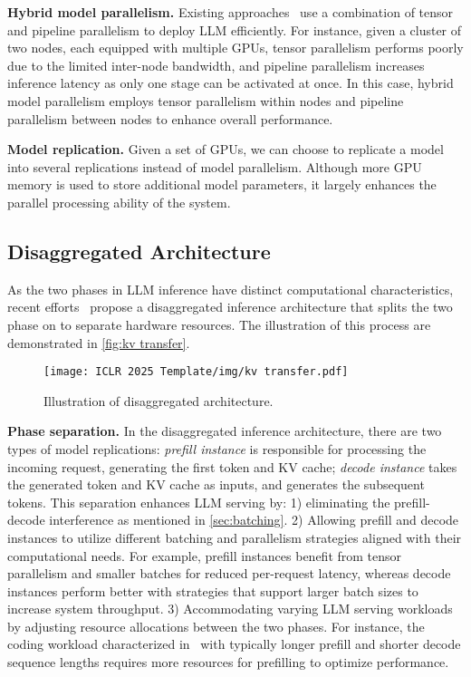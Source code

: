\textbf{Hybrid model parallelism.} Existing approaches~\cite{jianghexgen,zhong2024distserve,miao2024spotserve,li2023alpaserve} use a combination of tensor and pipeline parallelism to deploy LLM efficiently. For instance, given a cluster of two nodes, each equipped with multiple GPUs, tensor parallelism performs poorly due to the limited inter-node bandwidth, and pipeline parallelism increases inference latency as only one stage can be activated at once. In this case, hybrid model parallelism employs tensor parallelism within nodes and pipeline parallelism between nodes to enhance overall performance.

\textbf{Model replication.} Given a set of GPUs, we can choose to replicate a model into several replications instead of model parallelism. Although more GPU memory is used to store additional model parameters, it largely enhances the parallel processing ability of the system.

\subsection{Disaggregated Architecture}

As the two phases in LLM inference have distinct computational characteristics, recent efforts~\cite{zhong2024distserve,patel2024splitwise,jin2024p,qin2024mooncake,hu2024inference} propose a disaggregated inference architecture that splits the two phase on to separate hardware resources. The illustration of this process are demonstrated in \autoref{fig:kv transfer}.

\begin{wrapfigure}{r}{0.5\linewidth}
    \centering
    \texttt{[image: ICLR 2025 Template/img/kv transfer.pdf]}
    \caption{Illustration of disaggregated architecture.}
    \label{fig:kv transfer}
\end{wrapfigure} 


\textbf{Phase separation.} In the disaggregated inference architecture, there are two types of model replications: \textit{prefill instance} is responsible for processing the incoming request, generating the first token and KV cache; \textit{decode instance} takes the generated token and KV cache as inputs, and generates the subsequent tokens. This separation enhances LLM serving by: 1) eliminating the prefill-decode interference as mentioned in \autoref{sec:batching}. 2) Allowing prefill and decode instances to utilize different batching and parallelism strategies aligned with their computational needs. For example, prefill instances benefit from tensor parallelism and smaller batches for reduced per-request latency, whereas decode instances perform better with strategies that support larger batch sizes to increase system throughput. 3) Accommodating varying LLM serving workloads by adjusting resource allocations between the two phases. For instance, the coding workload characterized in~\cite{patel2024splitwise} with typically longer prefill and shorter decode sequence lengths requires more resources for prefilling to optimize performance.

